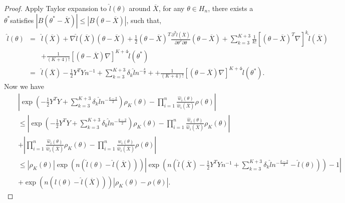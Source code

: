 \documentclass[oneside,english]{amsbook}
\numberwithin{section}{chapter}
\numberwithin{equation}{section}
\numberwithin{figure}{section}
\theoremstyle{plain}
\theoremstyle{plain}
\theoremstyle{definition}
\theoremstyle{plain}
\theoremstyle{plain}
\theoremstyle{remark}
\theoremstyle{definition}
\theoremstyle{definition}
\begin{document}
\begin{proof}
Apply Taylor expansion to $\hat{l}\left(\theta\right)$ around $\overline{X}$,
for any $\theta\in H_{n}$, there exists a $\theta^{*}$satisfies
$\left|B\left(\theta^{*}-\overline{X}\right)\right|\le\left|B\left(\theta-\overline{X}\right)\right|$,
such that, 
\begin{eqnarray*}
\hat{l}\left(\theta\right) & = & \hat{l}\left(\overline{X}\right)+\nabla\hat{l}\left(\overline{X}\right)\left(\theta-\overline{X}\right)+\frac{1}{2}\left(\theta-\overline{X}\right)^{T}\frac{\partial^{2}\hat{l}\left(\overline{X}\right)}{\partial\theta^{T}\partial\theta}\left(\theta-\overline{X}\right)+\sum_{k=3}^{K+3}\frac{1}{k!}\left[\left(\theta-\overline{X}\right)^{T}\nabla\right]^{k}\hat{l}\left(\overline{X}\right)\\
 &  & +\frac{1}{\left(K+4\right)!}\left[\left(\theta-\overline{X}\right)\nabla\right]^{K+4}\hat{l}\left(\theta^{*}\right)\\
 & = & \hat{l}\left(\overline{X}\right)-\frac{1}{2}Y^{T}Yn^{-1}+\sum_{k=3}^{K+3}\delta_{k}\hat{l}n^{-\frac{k}{2}}++\frac{1}{\left(K+4\right)!}\left[\left(\theta-\overline{X}\right)\nabla\right]^{K+4}\hat{l}\left(\theta^{*}\right).
\end{eqnarray*}
Now we have 
\begin{eqnarray*}
 &  & \left|\exp\left(-\frac{1}{2}Y^{T}Y+\sum_{k=3}^{K+3}\delta_{k}\hat{l}n^{-\frac{k-2}{2}}\right)\rho_{K}\left(\theta\right)-\prod_{i=1}^{n}\frac{\hat{w}_{i}\left(\theta\right)}{\hat{w}_{i}\left(\overline{X}\right)}\rho\left(\theta\right)\right|\\
 &  & \le\left|\exp\left(-\frac{1}{2}Y^{T}Y+\sum_{k=3}^{K+3}\delta_{k}\hat{l}n^{-\frac{k-2}{2}}\right)\rho_{K}\left(\theta\right)-\prod_{i=1}^{n}\frac{\hat{w}_{i}\left(\theta\right)}{\hat{w}_{i}\left(\overline{X}\right)}\rho_{K}\left(\theta\right)\right|\\
 &  & +\left|\prod_{i=1}^{n}\frac{\hat{w}_{i}\left(\theta\right)}{\hat{w}_{i}\left(\overline{X}\right)}\rho_{K}\left(\theta\right)-\prod_{i=1}^{n}\frac{\hat{w}_{i}\left(\theta\right)}{\hat{w}_{i}\left(\overline{X}\right)}\rho\left(\theta\right)\right|\\
 &  & \le\left|\rho_{K}\left(\theta\right)\right|\exp\left(n\left(\hat{l}\left(\theta\right)-\hat{l}\left(\overline{X}\right)\right)\right)\left|\exp\left(n\left(\hat{l}\left(\overline{X}\right)-\frac{1}{2}Y^{T}Yn^{-1}+\sum_{k=3}^{K+3}\delta_{k}\hat{l}n^{-\frac{k-2}{2}}-\hat{l}\left(\theta\right)\right)\right)-1\right|\\
 &  & +\exp\left(n\left(\hat{l}\left(\theta\right)-\hat{l}\left(\overline{X}\right)\right)\right)\left|\rho_{K}\left(\theta\right)-\rho\left(\theta\right)\right|.

\end{eqnarray*}
\end{proof}
\end{document}
